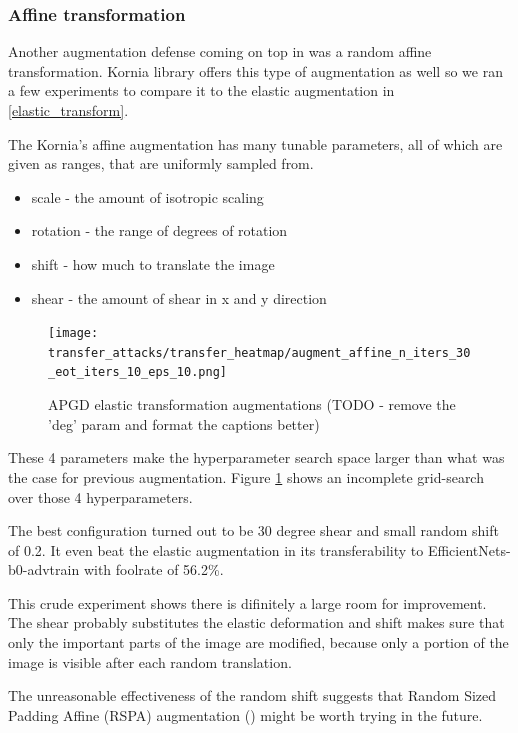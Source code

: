 \subsubsection{Affine transformation}
\label{affine_transform}
Another augmentation defense coming on top in \cite{qiu2020fencebox} was a random affine transformation. Kornia library offers this type of augmentation as well so we ran a few experiments to compare it to the elastic augmentation in \ref{elastic_transform}. 

The Kornia's affine augmentation has many tunable parameters, all of which are given as ranges, that are uniformly sampled from.
\begin{itemize}
    \item scale - the amount of isotropic scaling
    \item rotation - the range of degrees of rotation
    \item shift - how much to translate the image 
    \item shear - the amount of shear in x and y direction
\end{itemize}


\begin{figure}
    \centering
    \texttt{[image: transfer\_attacks/transfer\_heatmap/augment\_affine\_n\_iters\_30\_eot\_iters\_10\_eps\_10.png]}
    \caption{APGD elastic transformation augmentations (TODO - remove the 'deg' param and format the captions better)}
    \label{fig:apgd_affine}
\end{figure}


These 4 parameters make the hyperparameter search space larger than what was the case for previous augmentation. Figure \ref{fig:apgd_affine} shows an incomplete grid-search over those 4 hyperparameters.

The best configuration turned out to be 30 degree shear and small random shift of 0.2. It even beat the elastic augmentation in its transferability to EfficientNets-b0-advtrain with foolrate of 56.2\%.

This crude experiment shows there is difinitely a large room for improvement. The shear probably substitutes the elastic deformation and shift makes sure that only the important parts of the image are modified, because only a portion of the image is visible after each random translation.

The unreasonable effectiveness of the random shift suggests that Random Sized Padding Affine (RSPA) augmentation (\cite{qiu2020fencebox}) might be worth trying in the future.

